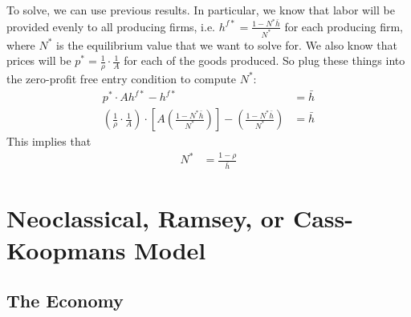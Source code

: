 \documentclass[12pt]{article}
\theoremstyle{plain}
\theoremstyle{definition}
\theoremstyle{remark}
\begin{document}
To solve, we can use previous results. In particular, we know that labor
will be provided evenly to all producing firms, i.e.
$h^{f*}=\frac{1-N^*\bar{h}}{N^*}$ for each producing firm, where $N^*$
is the equilibrium value that we want to solve for. We also know that
prices will be $p^*=\frac{1}{\rho}\cdot\frac{1}{A}$ for each of the
goods produced. So plug these things into the zero-profit free entry
condition to compute $N^*$:
\begin{align*}
  p^*\cdot Ah^{f*} - h^{f*} &= \bar{h} \\
  \left(\frac{1}{\rho}\cdot\frac{1}{A}\right)\cdot
  \left[A \left(\frac{1-N^*\bar{h}}{N^*}\right)\right]
  - \left(\frac{1-N^*\bar{h}}{N^*}\right)
  &= \bar{h}
\end{align*}
This implies that
\begin{align*}
  N^* &= \frac{1-\rho}{\bar{h}}
\end{align*}

\clearpage
\section{Neoclassical, Ramsey, or Cass-Koopmans Model}


\subsection{The Economy}
\end{document}
